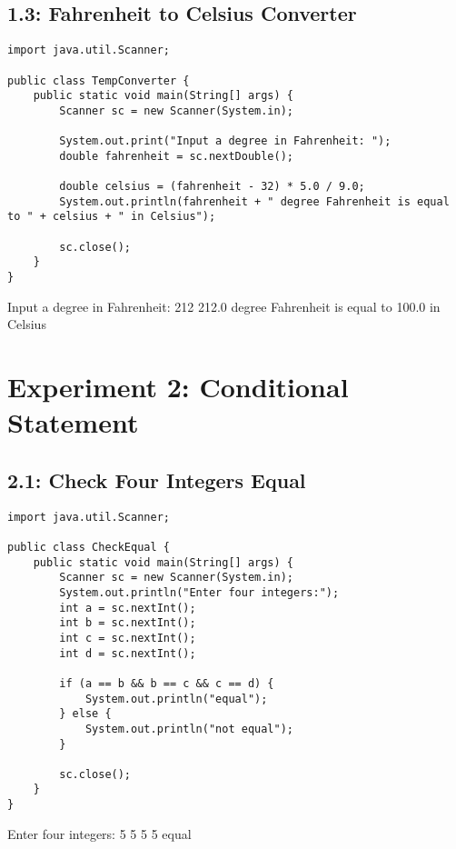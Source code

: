 \documentclass[a4paper,12pt]{article}
\begin{document}
\clearpage
\subsection{1.3: Fahrenheit to Celsius Converter}
\begin{samepage}
\begin{lstlisting}[caption={TempConverter.java}]
import java.util.Scanner;

public class TempConverter {
    public static void main(String[] args) {
        Scanner sc = new Scanner(System.in);
        
        System.out.print("Input a degree in Fahrenheit: ");
        double fahrenheit = sc.nextDouble();
        
        double celsius = (fahrenheit - 32) * 5.0 / 9.0;
        System.out.println(fahrenheit + " degree Fahrenheit is equal to " + celsius + " in Celsius");
        
        sc.close();
    }
}
\end{lstlisting}

\begin{outputlisting}
Input a degree in Fahrenheit: 212
212.0 degree Fahrenheit is equal to 100.0 in Celsius
\end{outputlisting}
\end{samepage}

\section{Experiment 2: Conditional Statement}

\clearpage
\subsection{2.1: Check Four Integers Equal}
\begin{samepage}
\begin{lstlisting}[caption={CheckEqual.java}]
import java.util.Scanner;

public class CheckEqual {
    public static void main(String[] args) {
        Scanner sc = new Scanner(System.in);
        System.out.println("Enter four integers:");
        int a = sc.nextInt();
        int b = sc.nextInt();
        int c = sc.nextInt();
        int d = sc.nextInt();
        
        if (a == b && b == c && c == d) {
            System.out.println("equal");
        } else {
            System.out.println("not equal");
        }
        
        sc.close();
    }
}
\end{lstlisting}

\begin{outputlisting}
Enter four integers:
5 5 5 5
equal
\end{outputlisting}
\end{samepage}
\end{document}
